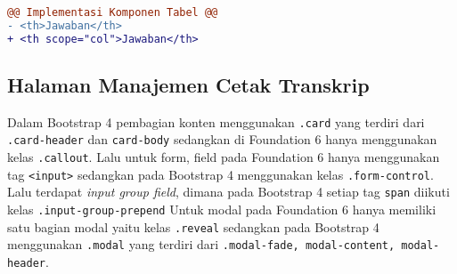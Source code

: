 \begin{lstlisting}[language=diff, caption=Perubahan file \path{\views\TranskripRequest\main.php}, label=Entri, basicstyle=\ttfamily, frame=single,
columns=fullflexible, keepspaces=true, breaklines=true]
@@ Implementasi Komponen Tabel @@
- <th>Jawaban</th>
+ <th scope="col">Jawaban</th>
\end{lstlisting}

\subsection{Halaman Manajemen Cetak Transkrip}
Dalam Bootstrap 4 pembagian konten menggunakan \texttt{.card} yang terdiri dari \texttt{.card-header} dan \texttt{card-body} sedangkan di Foundation 6 hanya menggunakan kelas \texttt{.callout}. Lalu untuk form, field pada Foundation 6 hanya menggunakan tag \texttt{<input>} sedangkan pada Bootstrap 4 menggunakan kelas \texttt{.form-control}.
Lalu terdapat \textit{input group field}, dimana pada Bootstrap 4 setiap tag \texttt{span} diikuti kelas \texttt{.input-group-prepend}
Untuk modal pada Foundation 6 hanya memiliki satu bagian modal yaitu kelas \texttt{.reveal} sedangkan pada Bootstrap 4 menggunakan \texttt{.modal} yang terdiri dari \texttt{.modal-fade, modal-content, modal-header}.
